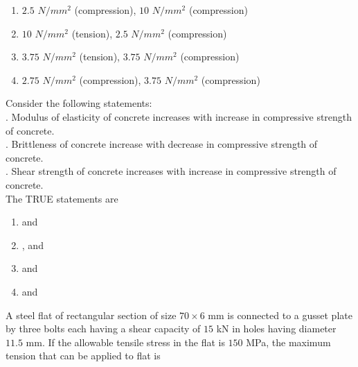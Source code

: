		    \begin{enumerate}
			    \item $2.5$ $N/mm^2$ (compression), $10$ $N/mm^2$ (compression)
			    \item $10$ $N/mm^2$ (tension), $2.5$ $N/mm^2$ (compression)
			    \item $3.75$ $N/mm^2$ (tension), $3.75$ $N/mm^2$ (compression)
			    \item $2.75$ $N/mm^2$ (compression), $3.75$ $N/mm^2$ (compression)\\
		    \end{enumerate}

        \item Consider the following statements:\\
	\uppercase\expandafter{}. Modulus of elasticity of concrete increases with increase in compressive strength of concrete.\\
	\uppercase\expandafter{}. Brittleness of concrete increase with decrease in compressive strength of concrete.\\
	\uppercase\expandafter{}. Shear strength of concrete increases with increase in compressive strength of concrete.\\
	The TRUE statements are
	\begin{enumerate}
		\item \uppercase\expandafter{} and \uppercase\expandafter{}
		\item \uppercase\expandafter{},\uppercase\expandafter{} and \uppercase\expandafter{}
		\item \uppercase\expandafter{} and \uppercase\expandafter{}
		\item \uppercase\expandafter{} and \uppercase\expandafter{}\\
	\end{enumerate}
          \item A steel flat of rectangular section of size $70\times6$ mm is connected to a gusset plate by three bolts each having a shear capacity of $15$ kN in holes having diameter $11.5$ mm. If the allowable tensile stress in the flat is $150$ MPa, the maximum tension that can be applied to flat is\\
